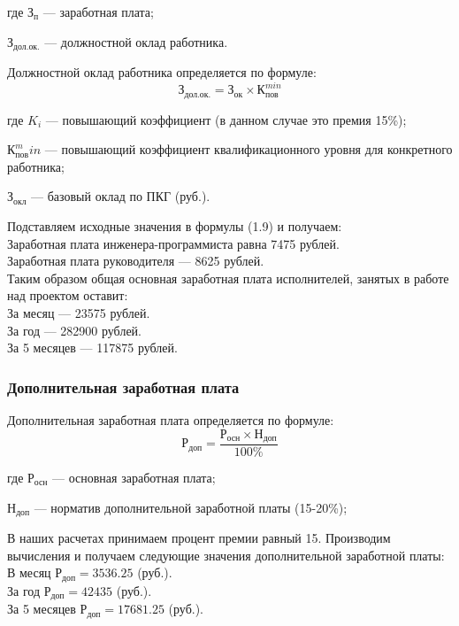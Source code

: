 \begin{ESKDexplanation}
	\item[где ]{} $\textrm{З}_{\textrm{п}}$ --- заработная плата;
	\item{} $\textrm{З}_{\textrm{дол.ок.}}$ --- должностной оклад работника.
\end{ESKDexplanation}
Должностной оклад работника определяется по формуле:
\begin{equation}
	\textrm{З}_{\textrm{дол.ок.}} = \textrm{З}_{\textrm{ок}} \times{} \textrm{К}_{\textrm{пов}}^{min}
\end{equation}
\begin{ESKDexplanation}
	\item[где ]{} $K_i$ --- повышающий коэффициент (в данном случае это премия 15\%);
	\item{} $\textrm{К}_{\textrm{пов}}^min$ --- повышающий коэффициент квалификационного уровня для конкретного работника;
	\item{} $\textrm{З}_{\textrm{окл}}$ --- базовый оклад по ПКГ (руб.).
\end{ESKDexplanation}
Подставляем исходные значения в формулы (1.9) и получаем: \\
Заработная плата инженера-программиста равна 7475 рублей. \\
Заработная плата руководителя --- 8625 рублей. \\
Таким образом общая основная заработная плата исполнителей, занятых в работе над проектом оставит: \\
За месяц --- 23575 рублей. \\
За год --- 282900 рублей. \\
За 5 месяцев --- 117875 рублей.


\subsubsection{Дополнительная заработная плата}
Дополнительная заработная плата определяется по формуле:
\begin{equation}
	\textrm{Р}_{\textrm{доп}} = \frac{\textrm{Р}_{\textrm{осн}} \times{} \textrm{Н}_{\textrm{доп}}} {100\%}
\end{equation}

\begin{ESKDexplanation}
	\item[где ]{} $\textrm{Р}_{\textrm{осн}}$ --- основная заработная плата;
	\item{} $\textrm{Н}_{\textrm{доп}}$ --- норматив дополнительной заработной платы (15-20\%);
\end{ESKDexplanation}
В наших расчетах принимаем процент премии равный 15.
Производим вычисления и получаем следующие значения дополнительной
заработной платы: \\
В месяц $\textrm{Р}_{\textrm{доп}} = 3536.25$ (руб.). \\
За год $\textrm{Р}_{\textrm{доп}} = 42435$ (руб.). \\
За 5 месяцев $\textrm{Р}_{\textrm{доп}} = 17681.25$ (руб.).


